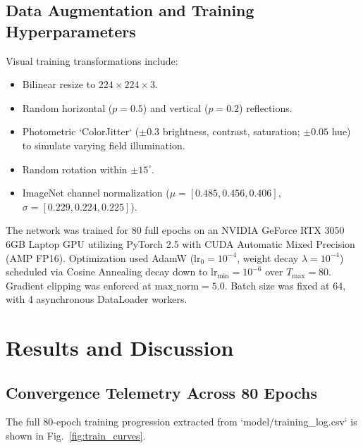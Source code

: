 \documentclass[conference]{IEEEtran}
\begin{document}
\subsection{Data Augmentation and Training Hyperparameters}
Visual training transformations include:
\begin{itemize}
    \item Bilinear resize to $224 \times 224 \times 3$.
    \item Random horizontal ($p = 0.5$) and vertical ($p = 0.2$) reflections.
    \item Photometric `ColorJitter` ($\pm 0.3$ brightness, contrast, saturation; $\pm 0.05$ hue) to simulate varying field illumination.
    \item Random rotation within $\pm 15^\circ$.
    \item ImageNet channel normalization ($\mu = [0.485, 0.456, 0.406]$, $\sigma = [0.229, 0.224, 0.225]$).
\end{itemize}

The network was trained for 80 full epochs on an NVIDIA GeForce RTX 3050 6GB Laptop GPU utilizing PyTorch 2.5 with CUDA Automatic Mixed Precision (AMP FP16). Optimization used AdamW ($\text{lr}_0 = 10^{-4}$, weight decay $\lambda = 10^{-4}$) scheduled via Cosine Annealing decay down to $\text{lr}_{\min} = 10^{-6}$ over $T_{\max} = 80$. Gradient clipping was enforced at $\text{max\_norm} = 5.0$. Batch size was fixed at 64, with 4 asynchronous DataLoader workers.

\section{Results and Discussion}

\subsection{Convergence Telemetry Across 80 Epochs}
The full 80-epoch training progression extracted from `model/training_log.csv` is shown in Fig.~\ref{fig:train_curves}.
\end{document}
